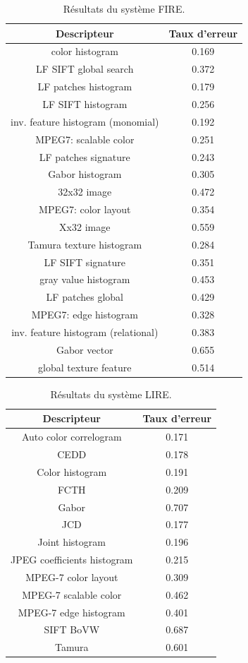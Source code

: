 	
\begin{table}[H]
\begin{center}
\begin{tabular}{|c|c|}
\hline
Descripteur & Taux d'erreur\\
\hline
color histogram & 0.169\\
LF SIFT global search & 0.372\\
LF patches histogram & 0.179\\
LF SIFT histogram & 0.256\\
inv. feature histogram (monomial) & 0.192\\
MPEG7: scalable color & 0.251\\
LF patches signature & 0.243\\
Gabor histogram & 0.305\\
32x32 image & 0.472\\
MPEG7: color layout & 0.354\\
Xx32 image & 0.559\\
Tamura texture histogram & 0.284\\
LF SIFT signature & 0.351\\
gray value histogram & 0.453\\
LF patches global & 0.429\\
MPEG7: edge histogram & 0.328\\
inv. feature histogram (relational) & 0.383\\
Gabor vector & 0.655\\
global texture feature & 0.514\\
\hline
\end{tabular}
\end{center}
\caption{Résultats du système FIRE.}
\end{table}


\begin{table}[H]
\begin{center}
\begin{tabular}{|c|c|}
\hline
Descripteur & Taux d'erreur\\
\hline
Auto color correlogram & 0.171\\
CEDD & 0.178\\
Color histogram & 0.191\\
FCTH & 0.209\\
Gabor & 0.707\\
JCD & 0.177\\
Joint histogram & 0.196\\
JPEG coefficients histogram & 0.215\\
MPEG-7 color layout & 0.309\\
MPEG-7 scalable color & 0.462\\
MPEG-7 edge histogram & 0.401\\
SIFT BoVW & 0.687\\
Tamura & 0.601\\
\hline
\end{tabular}
\end{center}
\caption{Résultats du système LIRE.}
\end{table}

